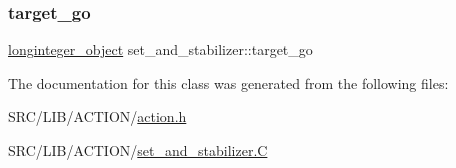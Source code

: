 \mbox{\label{classset__and__stabilizer_add16044e2efa05779e8a80366780d787}} 
\subsubsection{\texorpdfstring{target\+\_\+go}{target\_go}}
{\footnotesize\ttfamily \mbox{\hyperlink{classlonginteger__object}{longinteger\+\_\+object}} set\+\_\+and\+\_\+stabilizer\+::target\+\_\+go}



The documentation for this class was generated from the following files\+:\begin{DoxyCompactItemize}
\item 
S\+R\+C/\+L\+I\+B/\+A\+C\+T\+I\+O\+N/\mbox{\hyperlink{action_8h}{action.\+h}}\item 
S\+R\+C/\+L\+I\+B/\+A\+C\+T\+I\+O\+N/\mbox{\hyperlink{set__and__stabilizer_8_c}{set\+\_\+and\+\_\+stabilizer.\+C}}\end{DoxyCompactItemize}
